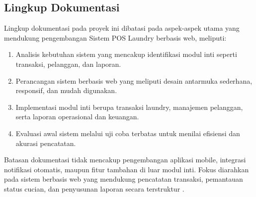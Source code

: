 \subsection{Lingkup Dokumentasi}
\noindent
Lingkup dokumentasi pada proyek ini dibatasi pada aspek-aspek utama yang mendukung pengembangan Sistem POS Laundry berbasis web, meliputi:

\begin{enumerate}
    \item Analisis kebutuhan sistem yang mencakup identifikasi modul inti seperti transaksi, pelanggan, dan laporan.
    \item Perancangan sistem berbasis web yang meliputi desain antarmuka sederhana, responsif, dan mudah digunakan.
    \item Implementasi modul inti berupa transaksi laundry, manajemen pelanggan, serta laporan operasional dan keuangan.
    \item Evaluasi awal sistem melalui uji coba terbatas untuk menilai efisiensi dan akurasi pencatatan.
\end{enumerate}

\noindent
Batasan dokumentasi tidak mencakup pengembangan aplikasi mobile, integrasi notifikasi otomatis, maupun fitur tambahan di luar modul inti. Fokus diarahkan pada sistem berbasis web yang mendukung pencatatan transaksi, pemantauan status cucian, dan penyusunan laporan secara terstruktur \cite{Mutia2025,Lizal2025,Kalo2023}.
